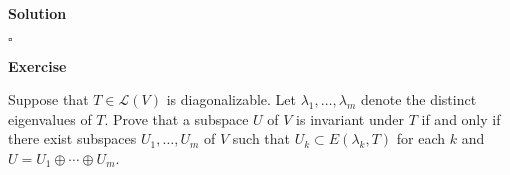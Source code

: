\documentclass{article}
\newenvironment{exercise}{%
{\textbf{Exercise\\}
    }
}{
}
\newenvironment{solution}{%
{
    \textbf{Solution\\}
    }
}{
  \hfill $\square$ 
  \par\bigskip 
}
\newcommand{\CC}{\mathbb{C}}
\newcommand{\FF}{\mathbb{F}}
\newcommand{\spans}{\text{Span}}
\begin{document}
\begin{CJK}{UTF8}{gkai}
\begin{solution}









\end{solution}

\begin{exercise}
    Suppose that $T \in \mathcal{L}(V)$ is diagonalizable. Let $\lambda_1,\ldots, \lambda_m$ denote the distinct eigenvalues of $T$. Prove that a subspace $U$ of $V$ is invariant under $T$ if and only if there exist subspaces $U_1,\ldots,U_m$ of $V$ such that $U_k \subset E(\lambda_k,T)$ for each $k$ and $U  = U_1 \oplus \cdots\oplus U_m$.
\end{exercise}


\end{CJK}
\end{document}
